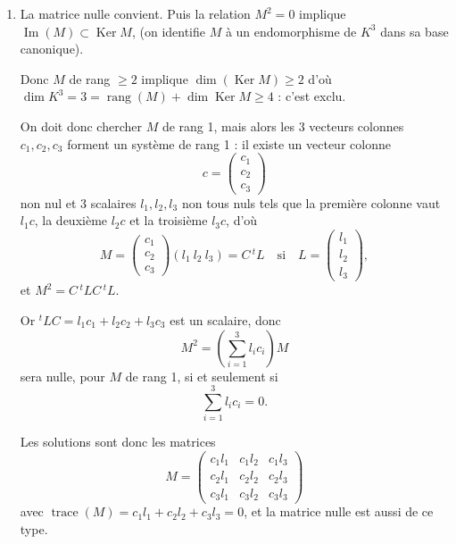 \begin{enumerate}[label=\arabic*.,leftmargin=2.2em,itemsep=1.2em]
\item La matrice nulle convient. Puis la relation $M^2=0$ implique $\operatorname{Im}(M)\subset\operatorname{Ker}M$, (on identifie $M$ à un endomorphisme de $K^3$ dans sa base canonique).

Donc $M$ de rang $\ge2$ implique $\dim(\operatorname{Ker}M)\ge2$ d'où $\dim K^3=3=\operatorname{rang}(M)+\dim\operatorname{Ker}M\ge4$ : c'est exclu.

On doit donc chercher $M$ de rang 1, mais alors les 3 vecteurs colonnes $c_1,c_2,c_3$ forment un système de rang 1 : il existe un vecteur colonne
\[
c=\begin{pmatrix}c_1\\c_2\\c_3\end{pmatrix}
\]
non nul et 3 scalaires $l_1,l_2,l_3$ non tous nuls tels que la première colonne vaut $l_1c$, la deuxième $l_2c$ et la troisième $l_3c$, d'où
\[
M=\begin{pmatrix}c_1\\c_2\\c_3\end{pmatrix}(l_1\ l_2\ l_3)=C\,{}^tL
\quad\text{si}\quad
L=\begin{pmatrix}l_1\\l_2\\l_3\end{pmatrix},
\]
et $M^2=C\,{}^tLC\,{}^tL$.

Or ${}^tLC=l_1c_1+l_2c_2+l_3c_3$ est un scalaire, donc
\[
M^2=\left(\sum_{i=1}^3l_ic_i\right)M
\]
sera nulle, pour $M$ de rang 1, si et seulement si
\[
\sum_{i=1}^3l_ic_i=0.
\]

Les solutions sont donc les matrices
\[
M=\begin{pmatrix}
c_1l_1&c_1l_2&c_1l_3\\
c_2l_1&c_2l_2&c_2l_3\\
c_3l_1&c_3l_2&c_3l_3
\end{pmatrix}
\]
avec $\operatorname{trace}(M)=c_1l_1+c_2l_2+c_3l_3=0$, et la matrice nulle est aussi de ce type.

\end{enumerate}
